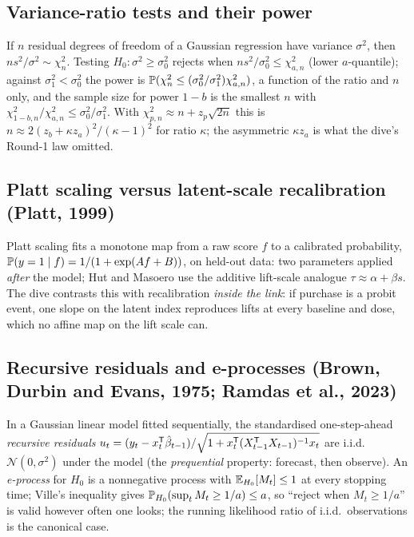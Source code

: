 \subsection{Variance-ratio tests and their power}

If $n$ residual degrees of freedom of a Gaussian regression have variance $\sigma^2$, then $ns^2/\sigma^2 \sim \chi^2_n$. Testing $H_0 : \sigma^2 \ge \sigma_0^2$ rejects when $ns^2/\sigma_0^2 \le \chi^2_{a,n}$ (lower $a$-quantile); against $\sigma_1^2 < \sigma_0^2$ the power is $\mathbb{P}(\chi^2_n \le (\sigma_0^2/\sigma_1^2)\chi^2_{a,n})$, a function of the ratio and $n$ only, and the sample size for power $1 - b$ is the smallest $n$ with $\chi^2_{1-b,n}/\chi^2_{a,n} \le \sigma_0^2/\sigma_1^2$. With $\chi^2_{p,n} \approx n + z_p\sqrt{2n}$ this is $n \approx 2(z_b + \kappa z_a)^2/(\kappa - 1)^2$ for ratio $\kappa$; the asymmetric $\kappa z_a$ is what the dive's Round-1 law omitted.

\subsection{Platt scaling versus latent-scale recalibration (Platt, 1999)}

Platt scaling fits a monotone map from a raw score $f$ to a calibrated probability, $\mathbb{P}(y = 1 \mid f) = 1/(1 + \exp(Af + B))$, on held-out data: two parameters applied \emph{after} the model; Hut and Masoero use the additive lift-scale analogue $\tau \approx \alpha + \beta s$. The dive contrasts this with recalibration \emph{inside the link}: if purchase is a probit event, one slope on the latent index reproduces lifts at every baseline and dose, which no affine map on the lift scale can.

\subsection{Recursive residuals and e-processes (Brown, Durbin and Evans, 1975; Ramdas et al., 2023)}

In a Gaussian linear model fitted sequentially, the standardised one-step-ahead \emph{recursive residuals} $u_t = (y_t - x_t^{\mathsf{T}}\hat\beta_{t-1})/\sqrt{1 + x_t^{\mathsf{T}}(X_{t-1}^{\mathsf{T}} X_{t-1})^{-1}x_t}$ are i.i.d.\ $\mathcal N(0, \sigma^2)$ under the model (the \emph{prequential} property: forecast, then observe). An \emph{e-process} for $H_0$ is a nonnegative process with $\mathbb{E}_{H_0}[M_t] \le 1$ at every stopping time; Ville's inequality gives $\mathbb{P}_{H_0}(\sup_t M_t \ge 1/a) \le a$, so ``reject when $M_t \ge 1/a$'' is valid however often one looks; the running likelihood ratio of i.i.d.\ observations is the canonical case.

